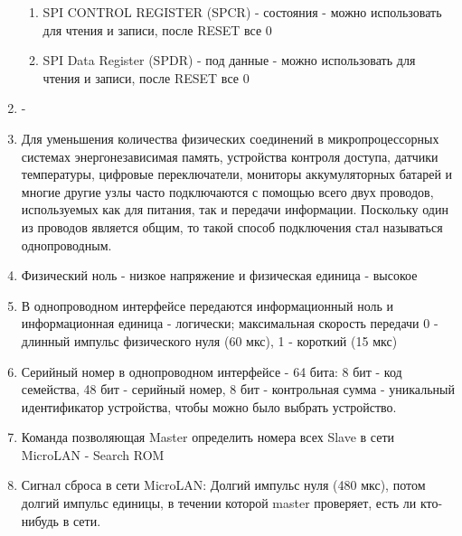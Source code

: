 \documentclass{article}
\begin{document}
\begin{enumerate}
\begin{enumerate}
			\item SPI CONTROL REGISTER (SPCR) - состояния - можно использовать для чтения и записи, после RESET все 0 
			\item SPI Data Register (SPDR) - под данные - можно использовать для чтения и записи, после RESET все 0 
		\end{enumerate} 
		\item -
		\item Для уменьшения количества физических соединений в микропроцессорных системах энергонезависимая память, устройства контроля доступа, датчики температуры, цифровые переключатели, мониторы аккумуляторных батарей и многие другие узлы часто подключаются с помощью всего двух проводов, используемых как для питания, так и передачи информации. Поскольку один из проводов является общим, то такой способ подключения стал называться однопроводным.
		\item Физический ноль - низкое напряжение и физическая единица - высокое
		\item В однопроводном интерфейсе передаются информационный ноль и информационная единица - логически; максимальная скорость  передачи 0 - длинный импульс физического нуля (60 мкс), 1 - короткий (15 мкс)
		\item Серийный номер в однопроводном интерфейсе - 64 бита: 8 бит - код семейства, 48 бит - серийный номер, 8 бит - контрольная сумма - уникальный идентификатор устройства, чтобы можно было выбрать устройство.
		\item Команда позволяющая Master определить номера всех Slave в сети MicroLAN - Search ROM
		\item Сигнал сброса в сети MicroLAN: Долгий импульс нуля (480 мкс), потом долгий импульс единицы, в течении которой master проверяет, есть ли кто-нибудь в сети.
	\end{enumerate}
\end{document}
